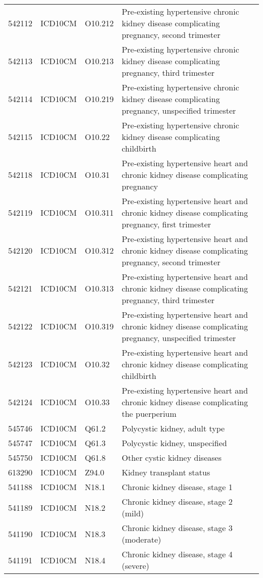 \begin{table}[ht]
\begin{tabular}{rlll}
  542112 & ICD10CM & O10.212 & Pre-existing hypertensive chronic kidney disease complicating pregnancy, second trimester \\ 
  542113 & ICD10CM & O10.213 & Pre-existing hypertensive chronic kidney disease complicating pregnancy, third trimester \\ 
  542114 & ICD10CM & O10.219 & Pre-existing hypertensive chronic kidney disease complicating pregnancy, unspecified trimester \\ 
  542115 & ICD10CM & O10.22 & Pre-existing hypertensive chronic kidney disease complicating childbirth \\ 
  542118 & ICD10CM & O10.31 & Pre-existing hypertensive heart and chronic kidney disease complicating pregnancy \\ 
  542119 & ICD10CM & O10.311 & Pre-existing hypertensive heart and chronic kidney disease complicating pregnancy, first trimester \\ 
  542120 & ICD10CM & O10.312 & Pre-existing hypertensive heart and chronic kidney disease complicating pregnancy, second trimester \\ 
  542121 & ICD10CM & O10.313 & Pre-existing hypertensive heart and chronic kidney disease complicating pregnancy, third trimester \\ 
  542122 & ICD10CM & O10.319 & Pre-existing hypertensive heart and chronic kidney disease complicating pregnancy, unspecified trimester \\ 
  542123 & ICD10CM & O10.32 & Pre-existing hypertensive heart and chronic kidney disease complicating childbirth \\ 
  542124 & ICD10CM & O10.33 & Pre-existing hypertensive heart and chronic kidney disease complicating the puerperium \\ 
  545746 & ICD10CM & Q61.2 & Polycystic kidney, adult type \\ 
  545747 & ICD10CM & Q61.3 & Polycystic kidney, unspecified \\ 
  545750 & ICD10CM & Q61.8 & Other cystic kidney diseases \\ 
  613290 & ICD10CM & Z94.0 & Kidney transplant status \\ 
  541188 & ICD10CM & N18.1 & Chronic kidney disease, stage 1 \\ 
  541189 & ICD10CM & N18.2 & Chronic kidney disease, stage 2 (mild) \\ 
  541190 & ICD10CM & N18.3 & Chronic kidney disease, stage 3 (moderate) \\ 
  541191 & ICD10CM & N18.4 & Chronic kidney disease, stage 4 (severe) \\ 

\end{tabular}
\end{table}
